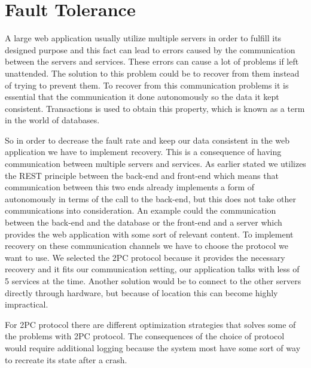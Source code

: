 \section{Fault Tolerance}
A large web application usually utilize multiple servers in order to fulfill its designed purpose and this fact can lead to errors caused by the communication between the servers and services. These errors can cause a lot of problems if left unattended. The solution to this problem could be to recover from them instead of trying to prevent them. To recover from this communication problems it is essential that the communication it done autonomously so the data it kept consistent. Transactions is used to obtain this property, which is known as a term in the world of databases.

So in order to decrease the fault rate and keep our data consistent in the web application we have to implement recovery. This is a consequence of having communication between multiple servers and services. As earlier stated we utilizes the REST principle between the back-end and front-end which means that communication between this two ends already implements a form of autonomously in terms of the call to the back-end, but this does not take other communications into consideration. An example could the communication between the back-end and the database or the front-end and a server which provides the web application with some sort of relevant content. To implement recovery on these communication channels we have to choose the protocol we want to use. We selected the 2PC protocol because it provides the necessary recovery and it fits our communication setting, our application talks with less of 5 services at the time. Another solution would be to connect to the other servers directly through hardware, but because of location this can become highly impractical.

For 2PC protocol there are different optimization strategies that solves some of the problems with 2PC protocol. The consequences of the choice of protocol would require additional logging because the system most have some sort of way to recreate its state after a crash.